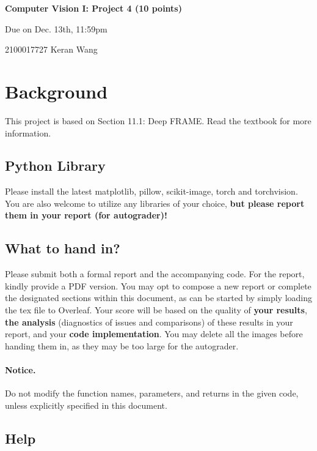 \documentclass[11pt]{article}
\begin{document}
\begin{center}
{\bf\Large Computer Vision I: Project 4 (10 points)}

\vspace{1em}
Due on Dec. 13th, 11:59pm

\vspace{1em}
2100017727 Keran Wang
\end{center}



\section{Background} 

This project is based on Section 11.1: Deep FRAME. Read the textbook for more information.

\subsection{Python Library}

Please install the latest matplotlib, pillow, scikit-image, torch and torchvision. You are also welcome to utilize any libraries of your choice, \textbf{but please report them in your report (for autograder)!}
\color{black}

\subsection{What to hand in?}

Please submit both a formal report and the accompanying code. For the report, kindly provide a PDF version. You may opt to compose a new report or complete the designated sections within this document, as can be started by simply loading the tex file to Overleaf. Your score will be based on the quality of \textbf{your results}, \textbf{the analysis} (diagnostics of issues and comparisons) of these results in your report, and your \textbf{code implementation}. You may delete all the images before handing them in, as they may be too large for the autograder.

\paragraph{Notice.} Do not modify the function names, parameters, and returns in the given code, unless explicitly specified in this document.

\subsection{Help}
\end{document}
